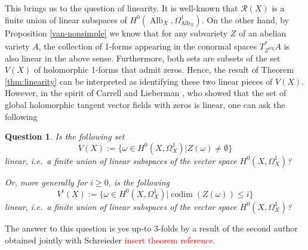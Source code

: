 \documentclass[12pt,reqno]{amsart}
\theoremstyle{question}
\newtheorem{question}[theorem]{Question}
\theoremstyle{definition}
\theoremstyle{remark}
\theoremstyle{cited}
\theoremstyle{citeddef}
\DeclareMathOperator{\codim}{codim}              %
\DeclareMathOperator{\reg}{reg}                  %
\DeclareMathOperator{\Alb}{Alb}
\newcommand{\sR}{\mathcal{R}}
\newcommand{\sorry}[1]{\textcolor{red}{#1}}
\begin{document}
This brings us to the question of linearity. It is well-known \cite[p.\ 311]{Ara92} that $\sR(X)$  is a finite union of linear subspaces of $H^0(\Alb_X, \Omega_{\Alb_X}^1)$. 
On the other hand, by Proposition \ref{van-nonsimple} we know that for any subvariety $Z$ of an abelian variety $A$, the collection
of 1-forms appearing in the conormal spaces $\overline{T^*_{Z^{\reg}}A}$ is also linear in the above sense. Furthermore, both sets are subsets of the set $V(X)$ of holomorphic 1-forms that admit zeros. Hence, the result of Theorem \ref{thm:linearity} can be interpreted as identifying these two linear pieces of $V(X)$. 
However, in the spirit of Carrell and Lieberman \cite{CL73}, who showed that
the set of global holomorphic tangent vector fields with zeros
is linear,
one can ask the following 
\begin{question}
Is the following set
\[V(X):=\{ \omega\in H^0(X, \Omega_X^1) | Z(\omega)\neq \emptyset\}\]
linear, i.e.\ a finite
union of linear subspaces of the vector space $H^0(X, \Omega_X^1)$?

Or, more generally
for $i\geq 0$, is the following 
\[V^i(X):=\{ \omega\in H^0(X, \Omega_X^1) | \codim(Z(\omega))\leq i\}\]
linear, i.e.\ a finite
union of linear subspaces of the vector space $H^0(X, \Omega_X^1)$?

\end{question} 

The answer to this question is yes up-to 3-folds by
a result of the second author obtained jointly with Schreieder
\sorry{insert theorem reference}. 


\end{document}
